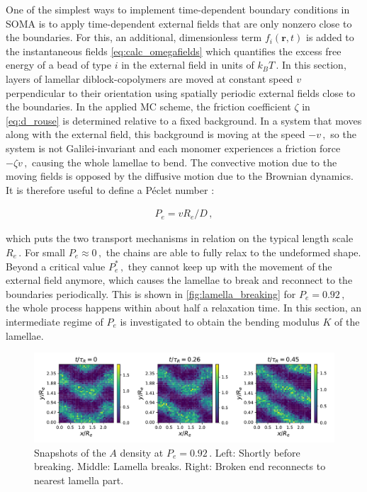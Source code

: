 \documentclass[bachelor,       %
               oneside,        %
               BCOR10mm,       %
               ngerman, english %
               ]{GAUBM}
\begin{document}
One of the simplest ways to implement time-dependent boundary conditions in \ac{SOMA} is to apply time-dependent external fields that are only nonzero close to the boundaries. For this, an additional, dimensionless term $f_i(\mathbf r,t)$ is added to the instantaneous fields \autoref{eq:calc_omegafields} which quantifies the excess free energy of a bead of type $i$ in the external field in units of $k_BT\,.$ In this section, layers of lamellar diblock-copolymers are moved at constant speed $v$ perpendicular to their orientation using spatially periodic external fields close to the boundaries. In the applied \ac{MC} scheme, the friction coefficient $\zeta$ in \autoref{eq:d_rouse} is determined relative to a fixed background. In a system that moves along with the external field, this background is moving at the speed $-v\,,$ so the system is not Galilei-invariant and each monomer experiences a friction force $-\zeta v\,,$ causing the whole lamellae to bend. The convective motion due to the moving fields is opposed by the diffusive motion due to the Brownian dynamics. It is therefore useful to define a P\'eclet number \cite{peclet}:

\begin{align}
    P_e= vR_e/D\,,
\end{align}


which puts the two transport mechanisms in relation on the typical length scale $R_e\,.$ For small $P_e\approx0\,,$ the chains are able to fully relax to the undeformed shape. Beyond a critical value $P_e^*\,,$ they cannot keep up with the movement of the external field anymore, which causes the lamellae to break and reconnect to the boundaries periodically. This is shown in \autoref{fig:lamella_breaking} for $P_e=0.92\,,$ the whole process happens within about half a relaxation time. In this section, an intermediate regime of $P_e$ is investigated to obtain the bending modulus $K$ of the lamellae. 


\begin{figure}[H]
    \centering
    \includegraphics[width=\textwidth]{figures/lamella_breaking.pdf}
    \caption{Snapshots of the $A$ density at $P_e=0.92\,.$ Left: Shortly before breaking. Middle: Lamella breaks. Right: Broken end reconnects to nearest lamella part.}
    \label{fig:lamella_breaking}
\end{figure}
\end{document}
